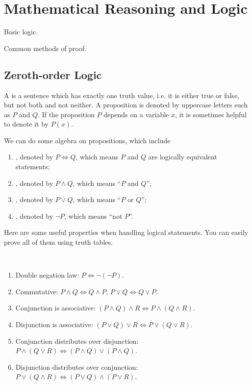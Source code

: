 \chapter{Mathematical Reasoning and Logic}\label{chap:logic-proofs}

\begin{summary}
\item Basic logic.
\item Common methods of proof.
\end{summary}

\section{Zeroth-order Logic}
A  is a sentence which has exactly one truth value, i.e. it is either true or false, but not both and not neither. A proposition is denoted by uppercase letters such as $P$ and $Q$. If the proposition $P$ depends on a variable $x$, it is sometimes helpful to denote it by $P(x)$. 

We can do some algebra on propositions, which include
\begin{enumerate}[label=(\roman*)]
\item {}, denoted by $P\iff Q$, which means $P$ and $Q$ are logically equivalent statements;

\item {}, denoted by $P\land Q$, which means ``$P$ and $Q$'';

\item {}, denoted by $P\lor Q$, which means ``$P$ or $Q$'';

\item {}, denoted by $\lnot P$, which means ``not $P$''.
\end{enumerate}

Here are some useful properties when handling logical statements. You can easily prove all of them using truth tables.
\begin{proposition} \
\begin{enumerate}[label=(\roman*)]
\item Double negation law: $P\iff\lnot(\lnot P)$.
\item Commutative: $P \land Q \iff Q \land P$, $P \lor Q \iff Q \lor P$.
\item Conjunction is associative: $(P\land Q)\land R \iff P\land (Q\land R)$.
\item Disjunction is associative: $(P\lor Q)\lor R \iff P\lor (Q\lor R)$.
\item Conjunction distributes over disjunction: $P\land(Q\lor R) \iff (P\land Q)\lor(P\land Q)$.
\item Disjunction distributes over conjunction: $P\lor(Q\land R) \iff (P\lor Q)\land(P\lor R)$.
\end{enumerate}
\end{proposition}

